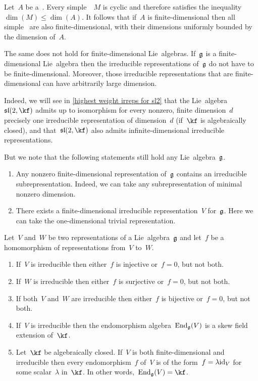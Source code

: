 \begin{remark}
  Let~$A$ be a~{\algebra{$\kf$}}.
  Every simple~{}~$M$ is cyclic and therefore satisfies the inequality~$\dim(M) \leq \dim(A)$.
  It follows that if~$A$ is finite-dimensional then all simple~{} are also finite-dimensional, with their dimensions uniformly bounded by the dimension of~$A$.
  
  The same does not hold for finite-dimensional Lie~algebras.
  If~$\mathfrak{g}$ is a finite-dimensional Lie~algebra then the irreducible representations of~$\mathfrak{g}$ do not have to be finite-dimensional.
  Moreover, those irreducible representations that are finite-dimensional can have arbitrarily large dimension.
  
  Indeed, we will see in \cref{highest weight irreps for sl2} that the Lie~algebra~$\sllie(2,\kf)$ admits up to isomorphism for every nonzero, finite dimension~$d$ precisely one irreducible representation of dimension~$d$ (if~$\kf$ is algebraically closed), and that~$\sllie(2,\kf)$ also admits infinite-dimensional irreducible representations.
  
  But we note that the following statements still hold any Lie~algebra~$\mathfrak{g}$.
  \begin{enumerate}
    \item
      Any nonzero finite-dimensional representation of~$\mathfrak{g}$ contains an irreducible subrepresentation.
      Indeed, we can take any subrepresentation of minimal nonzero dimension.
    \item
      There exists a finite-dimensional irreducible representation~$V$ for~$\mathfrak{g}$.
      Here we can take the one-dimensional trivial representation.
  \end{enumerate}
\end{remark}


\begin{proposition}[Schur]
  Let~$V$ and~$W$ be two representations of a Lie~algebra~$\mathfrak{g}$ and let~$f$ be a homomorphism of representations from~$V$ to~$W$.
  \begin{enumerate}
    \item
      If~$V$ is irreducible then either~$f$ is injective or~$f = 0$, but not both.
    \item
      If~$W$ is irreducible then either~$f$ is surjective or~$f = 0$, but not both.
    \item
      If both~$V$ and~$W$ are irreducible then either~$f$ is bijective or~$f = 0$, but not both.
    \item
      If~$V$ is irreducible then the endomorphism algebra~$\operatorname{End}_{\mathfrak{g}}(V)$ is a skew field extension of~$\kf$.
    \item
      Let~$\kf$ be algebraically closed.
      If~$V$ is both finite-dimensional and irreducible then every endomorphism~$f$ of~$V$ is of the form~$f = \lambda \mathrm{id}_V$ for some scalar~$\lambda$ in~$\kf$.
      In other words,~$\End_{\glie}(V) = \kf$.
  \end{enumerate}
\end{proposition}


